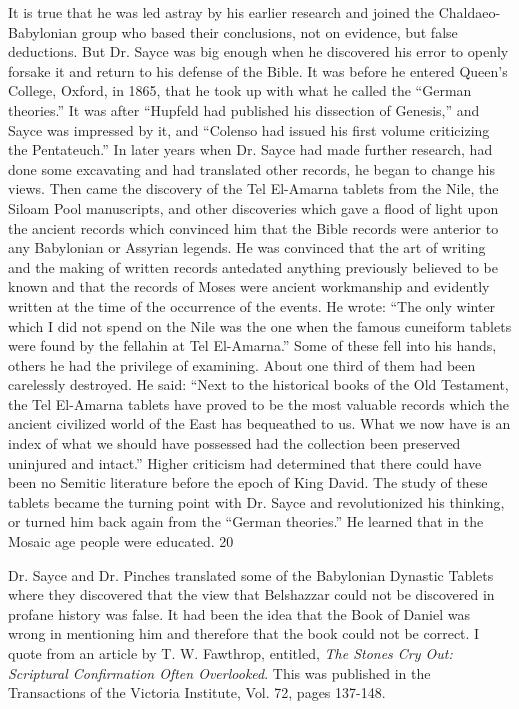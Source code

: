 It is true that he was led astray by his earlier research and joined the Chaldaeo-Babylonian
group who based their conclusions, not on evidence, but false deductions. But Dr. Sayce was
big enough when he discovered his error to openly forsake it and return to his defense of the
Bible. It was before he entered Queen's College, Oxford, in 1865, that he took up with what
he called the ``German theories.'' It was after ``Hupfeld had published his dissection of
Genesis,'' and Sayce was impressed by it, and ``Colenso had issued his first volume criticizing
the Pentateuch.'' In later years when Dr. Sayce had made further research, had done some
excavating and had translated other records, he began to change his views. Then came the
discovery of the Tel El-Amarna tablets from the Nile, the Siloam Pool manuscripts, and other
discoveries which gave a flood of light upon the ancient records which convinced him that
the Bible records were anterior to any Babylonian or Assyrian legends. He was convinced
that the art of writing and the making of written records antedated anything previously
believed to be known and that the records of Moses were ancient workmanship and evidently
written at the time of the occurrence of the events. He wrote: ``The only winter which I did
not spend on the Nile was the one when the famous cuneiform tablets were found by the
fellahin at Tel El-Amarna.'' Some of these fell into his hands, others he had the privilege of
examining. About one third of them had been carelessly destroyed. He said: ``Next to the
historical books of the Old Testament, the Tel El-Amarna tablets have proved to be the most
valuable records which the ancient civilized world of the East has bequeathed to us. What we
now have is an index of what we should have possessed had the collection been preserved
uninjured and intact.'' Higher criticism had determined that there could have been no Semitic
literature before the epoch of King David. The study of these tablets became the turning point
with Dr. Sayce and revolutionized his thinking, or turned him back again from the ``German
theories.'' He learned that in the Mosaic age people were educated. 20

Dr. Sayce and Dr. Pinches translated some of the Babylonian Dynastic Tablets where they
discovered that the view that Belshazzar could not be discovered in profane history was false.
It had been the idea that the Book of Daniel was wrong in mentioning him and therefore that
the book could not be correct. I quote from an article by T. W. Fawthrop, entitled, \textit{The Stones
Cry Out: Scriptural Confirmation Often Overlooked}. This was published in the Transactions
of the Victoria Institute, Vol. 72, pages 137-148.

